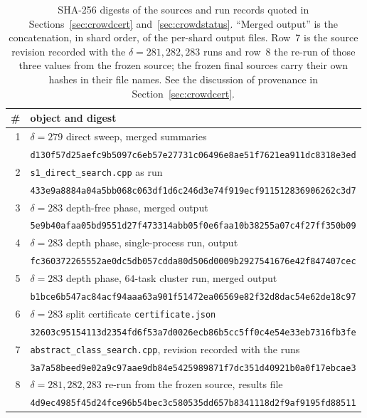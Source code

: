 \documentclass[11pt,a4paper]{article}
\theoremstyle{plain}
\theoremstyle{remark}
\newcommand{\file}[1]{\texttt{#1}}
\begin{document}
\begin{table}[ht]
\centering
\caption{SHA-256 digests of the sources and run records quoted in
Sections~\ref{sec:crowdcert} and~\ref{sec:crowdstatus}.  ``Merged output'' is
the concatenation, in shard order, of the per-shard output files.  Row~7 is the
source revision recorded with the $\delta=281,282,283$ runs and row~8 the
re-run of those three values from the frozen source; the frozen final sources
carry their own hashes in their file names.  See the discussion of provenance in
Section~\ref{sec:crowdcert}.}
\label{tab:crowdhash}
\footnotesize
\setlength{\tabcolsep}{4pt}
\begin{tabular}{@{}rl@{}}
\toprule
\# & object and digest\\
\midrule
1 & $\delta=279$ direct sweep, merged summaries\\
  & \texttt{\scriptsize d130f57d25aefc9b5097c6eb57e27731c06496e8ae51f7621ea911dc8318e3ed}\\
2 & \file{s1\_direct\_search.cpp} as run\\
  & \texttt{\scriptsize 433e9a8884a04a5bb068c063df1d6c246d3e74f919ecf911512836906262c3d7}\\
3 & $\delta=283$ depth-free phase, merged output\\
  & \texttt{\scriptsize 5e9b40afaa05bd9551d27f473314abb05f0e6faa10b38255a07c4f27ff350b09}\\
4 & $\delta=283$ depth phase, single-process run, output\\
  & \texttt{\scriptsize fc360372265552ae0dc5db057cdda80d506d0009b2927541676e42f847407cec}\\
5 & $\delta=283$ depth phase, $64$-task cluster run, merged output\\
  & \texttt{\scriptsize b1bce6b547ac84acf94aaa63a901f51472ea06569e82f32d8dac54e62de18c97}\\
6 & $\delta=283$ split certificate \file{certificate.json}\\
  & \texttt{\scriptsize 32603c95154113d2354fd6f53a7d0026ecb86b5cc5ff0c4e54e33eb7316fb3fe}\\
7 & \file{abstract\_class\_search.cpp}, revision recorded with the runs\\
  & \texttt{\scriptsize 3a7a58beed9e02a9c97aae9db84e5425989871f7dc351d40921b0a0f17ebcae3}\\
8 & $\delta=281,282,283$ re-run from the frozen source, results file\\
  & \texttt{\scriptsize 4d9ec4985f45d24fce96b54bec3c580535dd657b8341118d2f9af9195fd88511}\\

\end{tabular}
\end{table}
\end{document}
